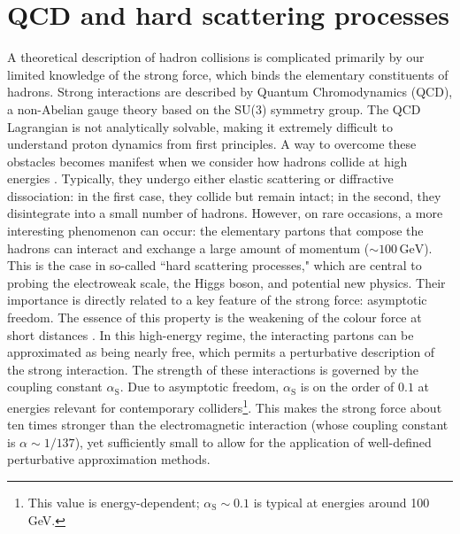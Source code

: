 \documentclass[a4paper, 12pt]{book}
\begin{document}
\section{QCD and hard scattering processes}
A theoretical description of hadron collisions is complicated primarily by our limited knowledge of the strong force, which binds the elementary constituents of hadrons. Strong interactions are described by Quantum Chromodynamics (QCD), a non-Abelian gauge theory based on the SU(3) symmetry group. The QCD Lagrangian is not analytically solvable, making it extremely difficult to understand proton dynamics from first principles. A way to overcome these obstacles becomes manifest when we consider how hadrons collide at high energies \cite{Asteriadis2020}. Typically, they undergo either elastic scattering or diffractive dissociation: in the first case, they collide but remain intact; in the second, they disintegrate into a small number of hadrons. However, on rare occasions, a more interesting phenomenon can occur: the elementary partons that compose the hadrons can interact and exchange a large amount of momentum ($\sim 100 \,\text{GeV}$). This is the case in so-called ``hard scattering processes," which are central to probing the electroweak scale, the Higgs boson, and potential new physics. Their importance is directly related to a key feature of the strong force: asymptotic freedom. The essence of this property is the weakening of the colour force at short distances \cite{ellis}. In this high-energy regime, the interacting partons can be approximated as being nearly free, which permits a perturbative description of the strong interaction. The strength of these interactions is governed by the coupling constant $\alpha_{\text{S}}$. Due to asymptotic freedom, $\alpha_{\text{S}}$ is on the order of $0.1$ at energies relevant for contemporary colliders\footnote{This value is energy-dependent; $\alpha_{\text{S}}\sim0.1$ is typical at energies around 100 GeV.}. This makes the strong force about ten times stronger than the electromagnetic interaction (whose coupling constant is $\alpha\sim1/137$), yet sufficiently small to allow for the application of well-defined perturbative approximation methods.
\end{document}
